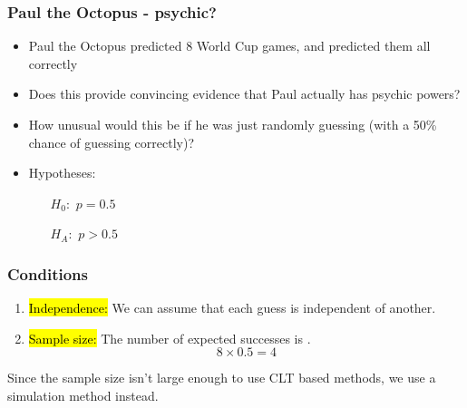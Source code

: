 
\begin{frame}
\frametitle{Paul the Octopus - psychic?}

\begin{itemize}

\item Paul the Octopus predicted 8 World Cup games, and predicted them all correctly  

\pause

\item Does this provide convincing evidence that Paul actually has psychic powers?

\pause

\item How unusual would this be if he was just randomly guessing (with a 50\% chance of 
guessing correctly)?

\pause

\item Hypotheses:
\begin{itemize}
\item[$H_0:$] $p = 0.5$
\item[$H_A:$] $p > 0.5$
\end{itemize}

\end{itemize}

\end{frame}


\begin{frame}
\frametitle{Conditions}

\begin{enumerate}

\item \hl{Independence:} We can assume that each guess is independent of another.

\pause

\item \hl{Sample size:} The number of expected successes is .
\[ 8 \times 0.5 = 4 \]

\end{enumerate}

\pause

\vspace{1cm}


\pause

Since the sample size isn't large enough to use CLT based methods, we use a simulation method instead.

\end{frame}

